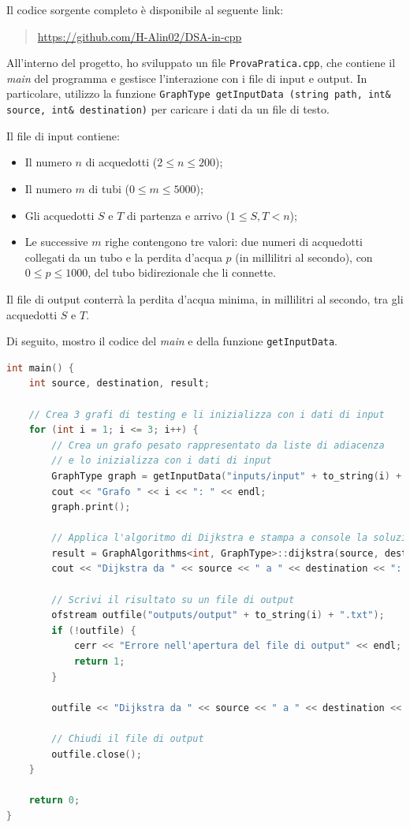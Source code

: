 \documentclass[a4paper,12pt]{article}
\begin{document}
Il codice sorgente completo è disponibile al seguente link:

\begin{quote}
    \url{https://github.com/H-Alin02/DSA-in-cpp}
\end{quote}

All'interno del progetto, ho sviluppato un file \texttt{ProvaPratica.cpp}, che contiene il 
\textit{main} del programma e gestisce l'interazione con i file di input e output. 
In particolare, utilizzo la funzione 
\texttt{GraphType getInputData (string path, int\& source, int\& destination)} 
per caricare i dati da un file di testo.

Il file di input contiene:
\begin{itemize}
    \item Il numero $n$ di acquedotti ($2 \leq n \leq 200$);
    \item Il numero $m$ di tubi ($0 \leq m \leq 5000$);
    \item Gli acquedotti $S$ e $T$ di partenza e arrivo ($1 \leq S, T < n$);
    \item Le successive $m$ righe contengono tre valori: due numeri di acquedotti collegati 
    da un tubo e la perdita d'acqua $p$ (in millilitri al secondo), con $0 \leq p \leq 1000$, 
    del tubo bidirezionale che li connette.
\end{itemize}

Il file di output conterrà la perdita d'acqua minima, in millilitri al secondo, tra gli acquedotti $S$ e $T$.

Di seguito, mostro il codice del \textit{main} e della funzione \texttt{getInputData}.

\begin{lstlisting}[language=c++, label=main]
int main() {
    int source, destination, result;

    // Crea 3 grafi di testing e li inizializza con i dati di input
    for (int i = 1; i <= 3; i++) {
        // Crea un grafo pesato rappresentato da liste di adiacenza 
        // e lo inizializza con i dati di input
        GraphType graph = getInputData("inputs/input" + to_string(i) + ".txt", source, destination);
        cout << "Grafo " << i << ": " << endl;
        graph.print();

        // Applica l'algoritmo di Dijkstra e stampa a console la soluzione
        result = GraphAlgorithms<int, GraphType>::dijkstra(source, destination, graph);
        cout << "Dijkstra da " << source << " a " << destination << ": " << result << " ml/s\n\n";

        // Scrivi il risultato su un file di output
        ofstream outfile("outputs/output" + to_string(i) + ".txt");
        if (!outfile) {
            cerr << "Errore nell'apertura del file di output" << endl;
            return 1;
        }

        outfile << "Dijkstra da " << source << " a " << destination << ": " << result << " ml/s" << endl;

        // Chiudi il file di output
        outfile.close();
    }

    return 0;
}
\end{lstlisting}
\end{document}

